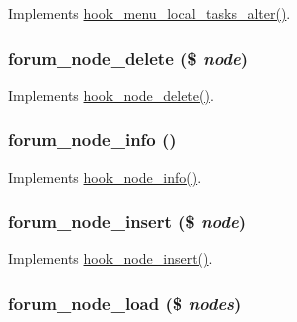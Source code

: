 \label{forum_8module_accd00b70ccd698d011c35ac51a5307be}
Implements \hyperlink{group__hooks_gac828fb6b28f1a8bb01c444a9b2331f5f}{hook\_\-menu\_\-local\_\-tasks\_\-alter()}. \hypertarget{forum_8module_a4fbf407b71fc0ec43d9730c279aef2f6}{
\subsubsection[{forum\_\-node\_\-delete}]{\setlength{\rightskip}{0pt plus 5cm}forum\_\-node\_\-delete (\$ {\em node})}}
\label{forum_8module_a4fbf407b71fc0ec43d9730c279aef2f6}
Implements \hyperlink{group__node__api__hooks_ga66ea0473a9950dc961802e801e5042e9}{hook\_\-node\_\-delete()}. \hypertarget{forum_8module_a6d1c8250830c247bcecf8950ab52c34e}{
\subsubsection[{forum\_\-node\_\-info}]{\setlength{\rightskip}{0pt plus 5cm}forum\_\-node\_\-info ()}}
\label{forum_8module_a6d1c8250830c247bcecf8950ab52c34e}
Implements \hyperlink{group__node__api__hooks_ga3b6ad51d7815d1cdd093b0e0f350cbd0}{hook\_\-node\_\-info()}. \hypertarget{forum_8module_a659bea74e419c7205f9f174973e742e9}{
\subsubsection[{forum\_\-node\_\-insert}]{\setlength{\rightskip}{0pt plus 5cm}forum\_\-node\_\-insert (\$ {\em node})}}
\label{forum_8module_a659bea74e419c7205f9f174973e742e9}
Implements \hyperlink{group__node__api__hooks_ga8b40dc62e46e5055c205d2a723dc3548}{hook\_\-node\_\-insert()}. \hypertarget{forum_8module_a4db7c947986e3cbbb6c81f247e53d7dd}{
\subsubsection[{forum\_\-node\_\-load}]{\setlength{\rightskip}{0pt plus 5cm}forum\_\-node\_\-load (\$ {\em nodes})}}
